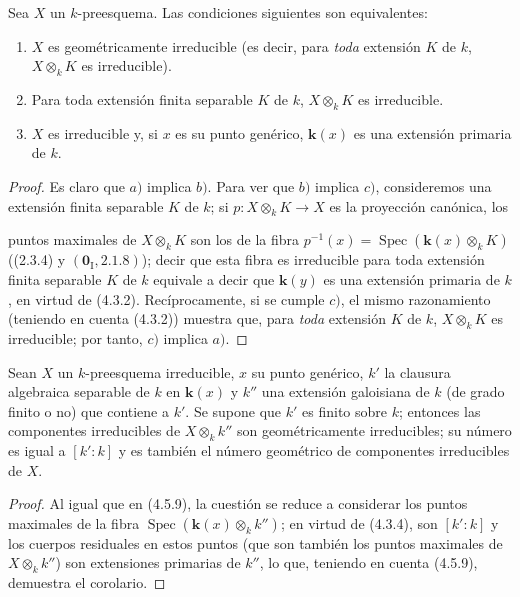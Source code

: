 \begin{proposition}[4.5.9]
\label{IV.2.4.5.9-fr}
Sea $X$ un $k$-preesquema. Las condiciones siguientes son equivalentes:
\begin{enumerate}
\item[\textup{a)}] $X$ es geométricamente irreducible \textup{(es decir, para \emph{toda}
extensión $K$ de $k$, $X\otimes_k K$ es irreducible)}.
\item[\textup{b)}] Para toda extensión finita separable $K$ de $k$, $X\otimes_k K$
es irreducible.
\item[\textup{c)}] $X$ es irreducible y, si $x$ es su punto genérico, $\boldsymbol{k}(x)$ es una
extensión primaria de $k$.
\end{enumerate}
\end{proposition}

\begin{proof}
Es claro que $a)$ implica $b)$. Para ver que $b)$ implica $c)$, consideremos
una extensión finita separable $K$ de $k$; si $p:X\otimes_k K\to X$ es la
proyección canónica, los


puntos maximales de $X\otimes_k K$ son los de la fibra
$p^{-1}(x)=\operatorname{Spec}(\boldsymbol{k}(x)\otimes_k K)$ ((2.3.4) y
$(\mathbf{0}_{\mathrm I},2.1.8)$); decir que esta fibra es irreducible para toda
extensión finita separable $K$ de $k$ equivale a decir que $\boldsymbol{k}(y)$ es una
extensión primaria de $k$, en virtud de (4.3.2). Recíprocamente, si se cumple
$c)$, el mismo razonamiento (teniendo en cuenta (4.3.2)) muestra que, para \emph{toda}
extensión $K$ de $k$, $X\otimes_k K$ es irreducible; por tanto, $c)$ implica
$a)$.
\end{proof}

\begin{corollary}[4.5.10]
\label{IV.2.4.5.10-fr}
Sean $X$ un $k$-preesquema irreducible, $x$ su punto genérico, $k'$ la
clausura algebraica separable de $k$ en $\boldsymbol{k}(x)$ y $k''$ una extensión
galoisiana de $k$ (de grado finito o no) que contiene a $k'$. Se supone que
$k'$ es finito sobre $k$; entonces las componentes irreducibles de
$X\otimes_k k''$ son geométricamente irreducibles; su número es igual a
$[k':k]$ y es también el número geométrico de componentes irreducibles de
$X$.
\end{corollary}

\begin{proof}
Al igual que en (4.5.9), la cuestión se reduce a considerar los puntos maximales de la
fibra $\operatorname{Spec}(\boldsymbol{k}(x)\otimes_k k'')$; en virtud de (4.3.4), son
$[k':k]$ y los cuerpos residuales en estos puntos (que son también los puntos
maximales de $X\otimes_k k''$) son extensiones primarias de $k''$, lo que,
teniendo en cuenta (4.5.9), demuestra el corolario.
\end{proof}

